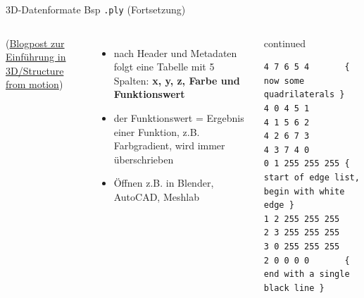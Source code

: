 \begin{frame}[fragile]{3D-Datenformate Bsp \texttt{.ply} (Fortsetzung)}

\begin{columns}
\footnotesize
  (\href{https://latex-ninja.com/2019/12/15/an-easy-intro-to-3d-models-from-structure-from-motion-sfm-photogrammetry/}{Blogpost zur Einführung in 3D/Structure from motion})

\begin{itemize}\footnotesize
    \item nach Header und Metadaten folgt eine Tabelle mit 5 Spalten: \textbf{x, y, z, Farbe und Funktionswert}
    \item der Funktionswert = Ergebnis einer Funktion, z.B. Farbgradient, wird immer überschrieben
    \item Öffnen z.B. in Blender, AutoCAD, Meshlab
\end{itemize}
  \tiny
  \begin{block}{}
  \lbrack{}continued\rbrack{}
  \begin{verbatim}
4 7 6 5 4       { now some quadrilaterals }
4 0 4 5 1
4 1 5 6 2
4 2 6 7 3
4 3 7 4 0
0 1 255 255 255 { start of edge list, begin with white edge }
1 2 255 255 255
2 3 255 255 255
3 0 255 255 255
2 0 0 0 0       { end with a single black line }
\end{verbatim}
  \end{block}
\end{columns}

\end{frame}



